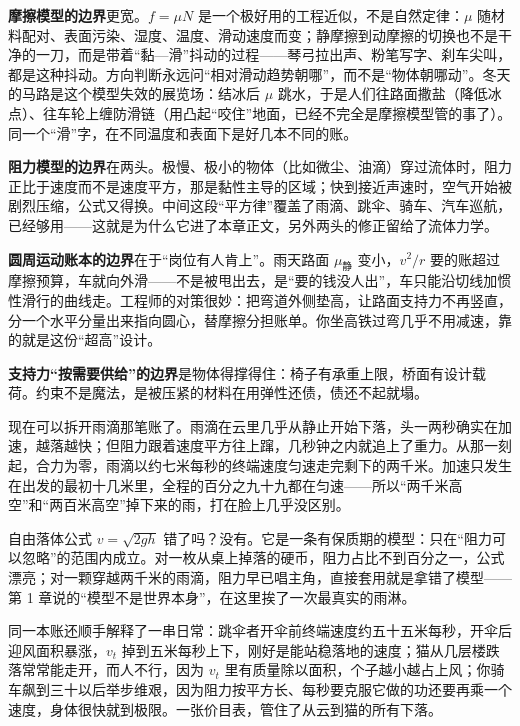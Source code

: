 \textbf{摩擦模型的边界}更宽。\(f=\mu N\) 是一个极好用的工程近似，不是自然定律：\(\mu\) 随材料配对、表面污染、湿度、温度、滑动速度而变；静摩擦到动摩擦的切换也不是干净的一刀，而是带着“黏—滑”抖动的过程——琴弓拉出声、粉笔写字、刹车尖叫，都是这种抖动。方向判断永远问“相对滑动趋势朝哪”，而不是“物体朝哪动”。冬天的马路是这个模型失效的展览场：结冰后 \(\mu\) 跳水，于是人们往路面撒盐（降低冰点）、往车轮上缠防滑链（用凸起“咬住”地面，已经不完全是摩擦模型管的事了）。同一个“滑”字，在不同温度和表面下是好几本不同的账。

\textbf{阻力模型的边界}在两头。极慢、极小的物体（比如微尘、油滴）穿过流体时，阻力正比于速度而不是速度平方，那是黏性主导的区域；快到接近声速时，空气开始被剧烈压缩，公式又得换。中间这段“平方律”覆盖了雨滴、跳伞、骑车、汽车巡航，已经够用——这就是为什么它进了本章正文，另外两头的修正留给了流体力学。

\textbf{圆周运动账本的边界}在于“岗位有人肯上”。雨天路面 \(\mu_{\text{静}}\) 变小，\(v^2/r\) 要的账超过摩擦预算，车就向外滑——不是被甩出去，是“要的钱没人出”，车只能沿切线加惯性滑行的曲线走。工程师的对策很妙：把弯道外侧垫高，让路面支持力不再竖直，分一个水平分量出来指向圆心，替摩擦分担账单。你坐高铁过弯几乎不用减速，靠的就是这份“超高”设计。

\textbf{支持力“按需要供给”的边界}是物体得撑得住：椅子有承重上限，桥面有设计载荷。约束不是魔法，是被压紧的材料在用弹性还债，债还不起就塌。


现在可以拆开雨滴那笔账了。雨滴在云里几乎从静止开始下落，头一两秒确实在加速，越落越快；但阻力跟着速度平方往上蹿，几秒钟之内就追上了重力。从那一刻起，合力为零，雨滴以约七米每秒的终端速度匀速走完剩下的两千米。加速只发生在出发的最初十几米里，全程的百分之九十九都在匀速——所以“两千米高空”和“两百米高空”掉下来的雨，打在脸上几乎没区别。

自由落体公式 \(v=\sqrt{2gh}\) 错了吗？没有。它是一条有保质期的模型：只在“阻力可以忽略”的范围内成立。对一枚从桌上掉落的硬币，阻力占比不到百分之一，公式漂亮；对一颗穿越两千米的雨滴，阻力早已唱主角，直接套用就是拿错了模型——第 1 章说的“模型不是世界本身”，在这里挨了一次最真实的雨淋。

同一本账还顺手解释了一串日常：跳伞者开伞前终端速度约五十五米每秒，开伞后迎风面积暴涨，\(v_t\) 掉到五米每秒上下，刚好是能站稳落地的速度；猫从几层楼跌落常常能走开，而人不行，因为 \(v_t\) 里有质量除以面积，个子越小越占上风；你骑车飙到三十以后举步维艰，因为阻力按平方长、每秒要克服它做的功还要再乘一个速度，身体很快就到极限。一张价目表，管住了从云到猫的所有下落。

